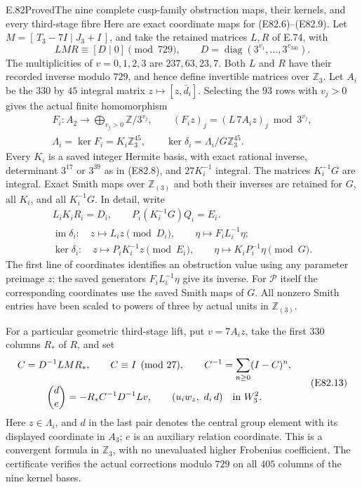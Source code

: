 \begin{statement}{E.82}{Proved}{The nine complete cusp-family obstruction maps, their kernels, and every third-stage fibre}
Here are exact coordinate maps for (E82.6)--(E82.9).
Let $M=[\,T_3-7I\mid J_3+I\,]$, and take the retained
matrices $L,R$ of E.74, with
\[
 LMR\equiv [D\mid0]\pmod{729},\qquad
 D=\operatorname{diag}(3^{v_1},\ldots,3^{v_{330}}).
 \tag{E82.10}
\]
The multiplicities of $v=0,1,2,3$ are $237,63,23,7$.
Both $L$ and $R$ have their recorded inverse modulo $729$,
and hence define invertible matrices over $\mathbb Z_3$.
Let $A_i$ be the $330$ by $45$ integral matrix
$z\mapsto[z,\bar d_i]$. Selecting the $93$ rows with
$v_j>0$ gives the actual finite homomorphism
\[
 \begin{gathered}
 F_i:A_2\longrightarrow
       \bigoplus_{v_j>0}\mathbb Z/3^{v_j},\qquad
 (F_iz)_j=(L\,7A_iz)_j\bmod3^{v_j},\\
 \Lambda_i=\ker F_i=K_i\mathbb Z_3^{45},\qquad
 \ker\delta_i=\Lambda_i/G\mathbb Z_3^{45}.
 \end{gathered}
 \tag{E82.11}
\]
Every $K_i$ is a saved integer Hermite basis, with exact
rational inverse, determinant $3^{17}$ or $3^{39}$ as in
(E82.8), and $27K_i^{-1}$ integral. The matrices
$K_i^{-1}G$ are integral. Exact Smith maps over
$\mathbb Z_{(3)}$ and both their inverses are retained for
$G$, all $K_i$, and all $K_i^{-1}G$.
In detail, write
\[
 \begin{gathered}
 L_iK_iR_i=D_i,\qquad
 P_i(K_i^{-1}G)Q_i=E_i.\\
 \operatorname{im}\delta_i:\quad
     z\longmapsto L_iz\pmod{D_i},\qquad
     \eta\longmapsto F_iL_i^{-1}\eta;\\
 \ker\delta_i:\quad
     z\longmapsto P_iK_i^{-1}z\pmod{E_i},\qquad
     \eta\longmapsto K_iP_i^{-1}\eta\pmod{G}.
 \end{gathered}
 \tag{E82.12}
\]
The first line of coordinates identifies an obstruction value
using any parameter preimage $z$; the saved generators
$F_iL_i^{-1}\eta$ give its inverse. For $\mathcal P$ itself
the corresponding coordinates use the saved Smith maps of $G$.
All nonzero Smith entries have been scaled to powers of three
by actual units in $\mathbb Z_{(3)}$.

For a particular geometric third-stage lift, put
$v=7A_iz$, take the first $330$ columns $R_*$ of $R$, and set
\[
 \begin{gathered}
 C=D^{-1}LMR_*,\qquad C\equiv I\pmod{27},\qquad
 C^{-1}=\sum_{n\ge0}(I-C)^n,\\
 \binom{d}{e}=-R_*C^{-1}D^{-1}Lv,\qquad
        (u_iw_z,\ d_i\,d)\quad\hbox{in }W_3^2.
 \end{gathered}
 \tag{E82.13}
\]
Here $z\in\Lambda_i$, and $d$ in the last pair denotes
the central group element with its displayed coordinate in
$A_3$; $e$ is an auxiliary relation coordinate. This is a
convergent formula in $\mathbb Z_3$, with no unevaluated
higher Frobenius coefficient. The certificate verifies the
actual corrections modulo $729$ on all $405$ columns of the
nine kernel bases.


\end{statement}
